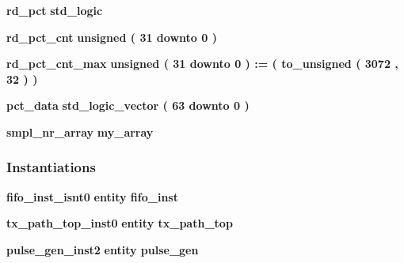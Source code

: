 \begin{DoxyCompactItemize}
\item 
{\bf rd\+\_\+pct} {\bfseries \textcolor{comment}{std\+\_\+logic}\textcolor{vhdlchar}{ }} 
\item 
{\bf rd\+\_\+pct\+\_\+cnt} {\bfseries \textcolor{comment}{unsigned}\textcolor{vhdlchar}{ }\textcolor{vhdlchar}{(}\textcolor{vhdlchar}{ }\textcolor{vhdlchar}{ } \textcolor{vhdldigit}{31} \textcolor{vhdlchar}{ }\textcolor{keywordflow}{downto}\textcolor{vhdlchar}{ }\textcolor{vhdlchar}{ } \textcolor{vhdldigit}{0} \textcolor{vhdlchar}{ }\textcolor{vhdlchar}{)}\textcolor{vhdlchar}{ }} 
\item 
{\bf rd\+\_\+pct\+\_\+cnt\+\_\+max} {\bfseries \textcolor{comment}{unsigned}\textcolor{vhdlchar}{ }\textcolor{vhdlchar}{(}\textcolor{vhdlchar}{ }\textcolor{vhdlchar}{ } \textcolor{vhdldigit}{31} \textcolor{vhdlchar}{ }\textcolor{keywordflow}{downto}\textcolor{vhdlchar}{ }\textcolor{vhdlchar}{ } \textcolor{vhdldigit}{0} \textcolor{vhdlchar}{ }\textcolor{vhdlchar}{)}\textcolor{vhdlchar}{ }\textcolor{vhdlchar}{ }\textcolor{vhdlchar}{ }\textcolor{vhdlchar}{\+:}\textcolor{vhdlchar}{=}\textcolor{vhdlchar}{ }\textcolor{vhdlchar}{(}\textcolor{vhdlchar}{ }\textcolor{vhdlchar}{ }\textcolor{vhdlchar}{ }\textcolor{vhdlchar}{ }\textcolor{vhdlchar}{to\+\_\+unsigned}\textcolor{vhdlchar}{ }\textcolor{vhdlchar}{(}\textcolor{vhdlchar}{ }\textcolor{vhdlchar}{ } \textcolor{vhdldigit}{3072} \textcolor{vhdlchar}{ }\textcolor{vhdlchar}{,}\textcolor{vhdlchar}{ }\textcolor{vhdlchar}{ } \textcolor{vhdldigit}{32} \textcolor{vhdlchar}{ }\textcolor{vhdlchar}{)}\textcolor{vhdlchar}{ }\textcolor{vhdlchar}{)}\textcolor{vhdlchar}{ }} 
\item 
{\bf pct\+\_\+data} {\bfseries \textcolor{comment}{std\+\_\+logic\+\_\+vector}\textcolor{vhdlchar}{ }\textcolor{vhdlchar}{(}\textcolor{vhdlchar}{ }\textcolor{vhdlchar}{ } \textcolor{vhdldigit}{63} \textcolor{vhdlchar}{ }\textcolor{keywordflow}{downto}\textcolor{vhdlchar}{ }\textcolor{vhdlchar}{ } \textcolor{vhdldigit}{0} \textcolor{vhdlchar}{ }\textcolor{vhdlchar}{)}\textcolor{vhdlchar}{ }} 
\item 
{\bf smpl\+\_\+nr\+\_\+array} {\bfseries {\bfseries {\bf my\+\_\+array}} \textcolor{vhdlchar}{ }} 
\end{DoxyCompactItemize}
\subsubsection*{Instantiations}
 \begin{DoxyCompactItemize}
\item 
{\bf fifo\+\_\+inst\+\_\+isnt0}  {\bfseries entity fifo\+\_\+inst}   
\item 
{\bf tx\+\_\+path\+\_\+top\+\_\+inst0}  {\bfseries entity tx\+\_\+path\+\_\+top}   
\item 
{\bf pulse\+\_\+gen\+\_\+inst2}  {\bfseries entity pulse\+\_\+gen}   
\end{DoxyCompactItemize}


